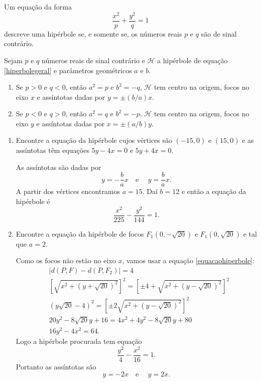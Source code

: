 \begin{proposicao}
  Um equação da forma
  \begin{equation}\label{hiperbolegeral}
    \dfrac{x^2}{p} + \dfrac{y^2}{q} = 1
  \end{equation}
  descreve uma hipérbole se, e somente se, os n\'umeros reais $p$ e $q$ são de sinal contr\'ario.
\end{proposicao}

\begin{corolario}
  Sejam $p$ e $q$ n\'umeros reais de sinal contr\'ario e $\mathcal{H}$ a hipérbole de equação \eqref{hiperbolegeral} e parâmetros geométricos $a$ e $b$.
  \begin{enumerate}
    \item Se $p > 0$ e $q < 0$, então $a^2 = p$ e $b^2 = -q$, $\mathcal{H}$ tem centro na origem, focos no eixo $x$ e assíntotas dadas por $y = \pm(b/a)x$.
    \item Se $p < 0$ e $q > 0$, então $a^2 = q$ e $b^2 = -p$, $\mathcal{H}$ tem centro na origem, focos no eixo $y$ e assíntotas dadas por $x = \pm(a/b)y$.
  \end{enumerate}
\end{corolario}

\begin{exemplos}
  \begin{enumerate}
    \item Encontre a equação da hipérbole cujos vértices são $(-15,0)$ e $(15,0)$ e as assíntotas têm equações $5y - 4x = 0$ e $5y + 4x = 0$.
    \begin{solucao}
      As assíntotas são dadas por
      \[
        y = -\dfrac{b}{a}x \quad\mbox{e }\quad y = \dfrac{b}{a}x.
      \]
      A partir dos vértices encontramos $a = 15$. Daí $b = 12$ e então a equação da hipérbole é
      \[
        \dfrac{x^2}{225} - \dfrac{y^2}{144} = 1.
      \]
    \end{solucao}
    \item Encontre a equação da hipérbole de focos $F_1(0,-\sqrt{20})$ e $F_1(0,\sqrt{20})$ e tal que $a = 2$.
    \begin{solucao}
      Como os focos não estão no eixo $x$, vamos usar a equação \eqref{equacaohiperbole}:
      \begin{align*}
        &\mid d(P,F) - d(P,F_2)\mid = 4\\
        &\left[\sqrt{x^2 + (y + \sqrt{20})^2}\right]^2 = \left[\pm 4 + \sqrt{x^2 + (y - \sqrt{20})^2}\right]^2\\
        &(y\sqrt{20} - 4)^2 = \left[\pm 2\sqrt{x^2 + (y - \sqrt{20})^2}\right]^2\\
        &20y^2 - 8\sqrt{20}y + 16 = 4x^2 + 4y^2 - 8\sqrt{20}y + 80\\
        &16y^2 - 4x^2 = 64.
      \end{align*}
      Logo a hipérbole procurada tem equação
      \[
        \dfrac{y^2}{4} - \dfrac{x^2}{16} = 1.
      \]
      Portanto as assíntotas são
      \[
        y = -2x \quad\mbox{e }\quad y = 2x.
      \]
    \end{solucao}
  \end{enumerate}
\end{exemplos}

